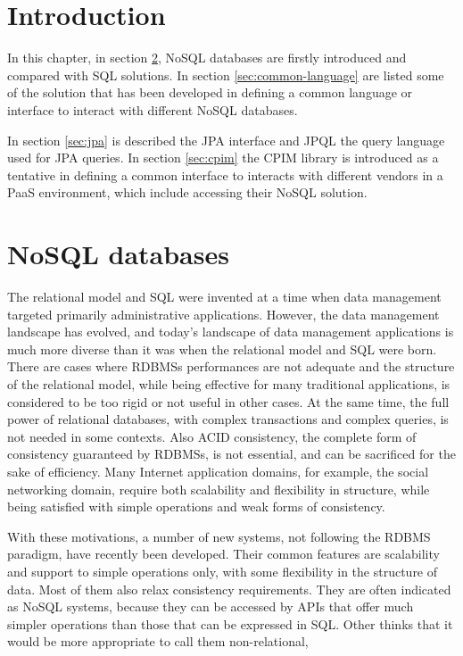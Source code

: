 \section{Introduction}
In this chapter, in section \ref{sec:nosql}, NoSQL databases are firstly introduced and compared with SQL solutions. In section \ref{sec:common-language} are listed some of the solution that has been developed in defining a common language or interface to interact with different NoSQL databases.

\noindent In section \ref{sec:jpa} is described the JPA interface and JPQL the query language used for JPA queries. In section \ref{sec:cpim} the CPIM library is introduced as a tentative in defining a common interface to interacts with different vendors in a PaaS environment, which include accessing their NoSQL solution.

\section{NoSQL databases}
\label{sec:nosql}
The relational model and SQL were invented at a time when data management targeted primarily administrative applications. However, the data management landscape has evolved, and today’s landscape of data management applications is much more diverse than it was when the relational model and SQL were born.
There are cases where RDBMSs performances are not adequate and the structure of the relational model, while being effective for many traditional applications, is considered to be too rigid or not useful in other cases.
At the same time, the full power of relational databases, with complex transactions and complex queries, is not needed in some contexts. Also ACID consistency, the complete form of consistency guaranteed by RDBMSs, is not essential, and can be sacrificed for the sake of efficiency. 
Many Internet application domains, for example, the social networking domain, require both scalability and flexibility in structure, while being satisfied with simple operations and weak forms of consistency.

\newparagraph With these motivations, a number of new systems, not following the RDBMS paradigm, have recently been developed. Their common features are scalability and support to simple operations only, with some flexibility in the structure of data. Most of them also relax consistency requirements. They are often indicated as NoSQL systems, because they can be accessed by APIs that offer much simpler operations than those that can be expressed in SQL. 
Other thinks that it would be more appropriate to call them non-relational, 

